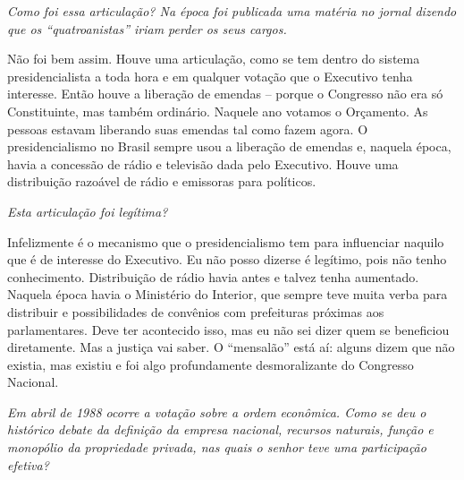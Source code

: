 \medskip

\noindent\emph{Como foi essa articulação? Na época foi publicada uma matéria no
jornal dizendo que os ``quatroanistas'' iriam perder os seus cargos.}

Não foi bem assim. Houve uma articulação, como se tem
dentro do sistema presidencialista a toda hora e em qualquer votação que
o Executivo tenha interesse. Então houve a liberação de emendas --
porque o Congresso não era só Constituinte, mas também ordinário.
Naquele ano votamos o Orçamento. As pessoas estavam liberando suas
emendas tal como fazem agora. O presidencialismo no Brasil sempre usou a
liberação de emendas e, naquela época, havia a concessão de rádio e
televisão dada pelo Executivo. Houve uma distribuição razoável de rádio
e emissoras para políticos.

\medskip

\noindent\emph{Esta articulação foi legítima?}

Infelizmente é o mecanismo que o presidencialismo tem
para influenciar naquilo que é de interesse do Executivo. Eu não posso
dizerse é legítimo, pois não tenho conhecimento. Distribuição de rádio
havia antes e talvez tenha aumentado. Naquela época havia o Ministério
do Interior, que sempre teve muita verba para distribuir e
possibilidades de convênios com prefeituras próximas aos parlamentares.
Deve ter acontecido isso, mas eu não sei dizer quem se beneficiou
diretamente. Mas a justiça vai saber. O ``mensalão'' está aí: alguns
dizem que não existia, mas existiu e foi algo profundamente
desmoralizante do Congresso Nacional.

\medskip

\noindent\emph{Em abril de 1988 ocorre a votação sobre a ordem econômica. Como
se deu o histórico debate da definição da empresa nacional, recursos
naturais, função e monopólio da propriedade privada, nas quais o senhor
teve uma participação efetiva?}

